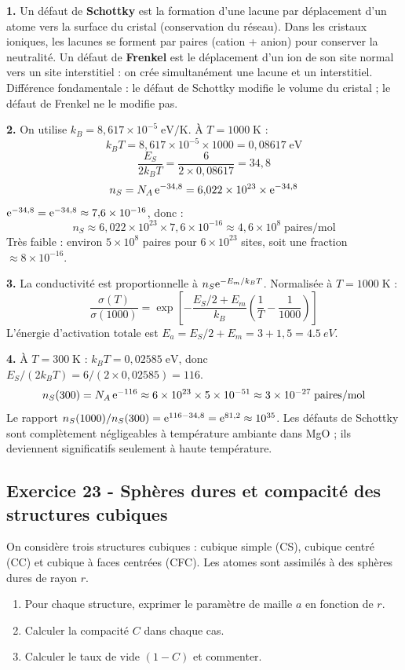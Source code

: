 \documentclass[12pt,a4paper]{article}
\begin{document}
\begin{boitecorrige}
\textbf{1.} Un défaut de \textbf{Schottky} est la formation d'une lacune par déplacement d'un atome vers la surface du cristal (conservation du réseau). Dans les cristaux ioniques, les lacunes se forment par paires (cation + anion) pour conserver la neutralité. Un défaut de \textbf{Frenkel} est le déplacement d'un ion de son site normal vers un site interstitiel : on crée simultanément une lacune et un interstitiel. Différence fondamentale : le défaut de Schottky modifie le volume du cristal ; le défaut de Frenkel ne le modifie pas.

\textbf{2.} On utilise $k_B = 8{,}617\times10^{-5}\;\text{eV/K}$. À $T=1000\;\text{K}$ :
\[
k_BT = 8{,}617\times10^{-5}\times1000 = 0{,}08617\;\text{eV}
\]
\[
\frac{E_S}{2k_BT} = \frac{6}{2\times0{,}08617} = 34{,}8
\]
\[
n_S = N_A\,\mathrm{e}^{-34{,}8} = 6{,}022\times10^{23}\times\mathrm{e}^{-34{,}8}
\]
$\mathrm{e}^{-34{,}8} = \mathrm{e}^{-34{,}8} \approx 7{,}6\times10^{-16}$, donc :
\[
n_S \approx 6{,}022\times10^{23}\times7{,}6\times10^{-16} \approx 4{,}6\times10^8\;\text{paires/mol}
\]
Très faible : environ $5\times10^8$ paires pour $6\times10^{23}$ sites, soit une fraction $\approx 8\times10^{-16}$.

\textbf{3.} La conductivité est proportionnelle à $n_S\mathrm{e}^{-E_m/k_BT}$. Normalisée à $T=1000\;\text{K}$ :
\[
\frac{\sigma(T)}{\sigma(1000)} = \exp\!\left[-\frac{E_S/2+E_m}{k_B}\left(\frac{1}{T}-\frac{1}{1000}\right)\right]
\]
L'énergie d'activation totale est $E_a = E_S/2 + E_m = 3+1{,}5 = \qty{4.5}{eV}$.

\textbf{4.} À $T=300\;\text{K}$ : $k_BT = 0{,}02585\;\text{eV}$, donc $E_S/(2k_BT) = 6/(2\times0{,}02585) = 116$.
\[
n_S(300) = N_A\,\mathrm{e}^{-116} \approx 6\times10^{23}\times5\times10^{-51} \approx 3\times10^{-27}\;\text{paires/mol}
\]
Le rapport $n_S(1000)/n_S(300) = \mathrm{e}^{116-34{,}8} = \mathrm{e}^{81{,}2} \approx 10^{35}$. Les défauts de Schottky sont complètement négligeables à température ambiante dans MgO ; ils deviennent significatifs seulement à haute température.
\end{boitecorrige}

\subsection*{Exercice 23 - Sphères dures et compacité des structures cubiques \niveau{\facile}}

\begin{boiteexercice}
On considère trois structures cubiques : cubique simple (CS), cubique centré (CC) et cubique à faces centrées (CFC). Les atomes sont assimilés à des sphères dures de rayon $r$.
\begin{enumerate}
  \item Pour chaque structure, exprimer le paramètre de maille $a$ en fonction de $r$.
  \item Calculer la compacité $C$ dans chaque cas.
  \item Calculer le taux de vide $(1-C)$ et commenter.
\end{enumerate}
\end{boiteexercice}
\end{document}
